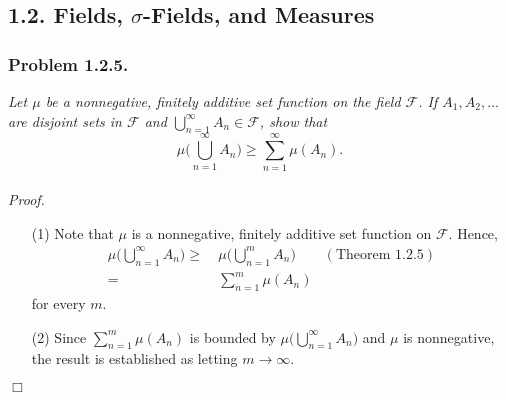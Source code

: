 \documentclass{article}
\begin{document}
\subsection*{1.2. Fields, $\sigma$-Fields, and Measures \\}






\subsubsection*{Problem 1.2.5.}
\emph{Let $\mu$ be a nonnegative,
finitely additive set function on the field $\mathscr{F}$.
If $A_1, A_2, \ldots$ are disjoint sets in $\mathscr{F}$
and $\bigcup_{n=1}^{\infty} A_n \in \mathscr{F}$, show that}
\[
  \mu \Bigg( \bigcup_{n=1}^{\infty} A_n \Bigg)
  \geq
  \sum_{n=1}^{\infty} \mu(A_n).
\] \\



\emph{Proof.}
\begin{enumerate}
\item[(1)]
  Note that $\mu$ is a nonnegative, finitely additive set function on $\mathscr{F}$.
  Hence,
  \begin{align*}
    \mu \Bigg( \bigcup_{n=1}^{\infty} A_n \Bigg)
    \geq
    & \:
      \mu \Bigg( \bigcup_{n=1}^{m} A_n \Bigg)
      & (\text{Theorem 1.2.5}) \\
    =
    & \:
      \sum_{n=1}^{m} \mu(A_n)
  \end{align*}
  for every $m$.

\item[(2)]
  Since $\sum_{n=1}^{m} \mu(A_n)$ is bounded by $\mu \big( \bigcup_{n=1}^{\infty} A_n \big)$
  and $\mu$ is nonnegative,
  the result is established as letting $m \to \infty$.
\end{enumerate}
$\Box$ \\\\


\end{document}
